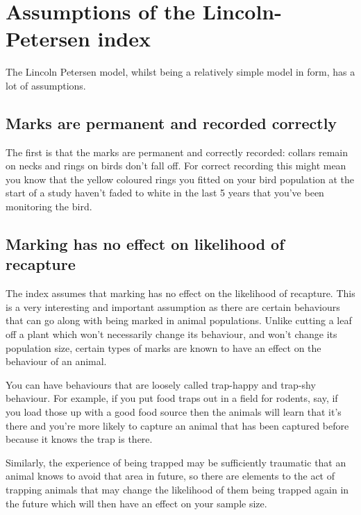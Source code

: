 \documentclass[
  letterpaper,
  DIV=11,
  numbers=noendperiod]{scrreprt}
\begin{document}
\section{Assumptions of the Lincoln-Petersen
index}\label{assumptions-of-the-lincoln-petersen-index}

The Lincoln Petersen model, whilst being a relatively simple model in
form, has a lot of assumptions.

\subsection{Marks are permanent and recorded
correctly}\label{marks-are-permanent-and-recorded-correctly}

The first is that the marks are permanent and correctly recorded:
collars remain on necks and rings on birds don't fall off. For correct
recording this might mean you know that the yellow coloured rings you
fitted on your bird population at the start of a study haven't faded to
white in the last 5 years that you've been monitoring the bird.

\subsection{Marking has no effect on likelihood of
recapture}\label{marking-has-no-effect-on-likelihood-of-recapture}

The index assumes that marking has no effect on the likelihood of
recapture. This is a very interesting and important assumption as there
are certain behaviours that can go along with being marked in animal
populations. Unlike cutting a leaf off a plant which won't necessarily
change its behaviour, and won't change its population size, certain
types of marks are known to have an effect on the behaviour of an
animal.

You can have behaviours that are loosely called trap-happy and trap-shy
behaviour. For example, if you put food traps out in a field for
rodents, say, if you load those up with a good food source then the
animals will learn that it's there and you're more likely to capture an
animal that has been captured before because it knows the trap is there.

Similarly, the experience of being trapped may be sufficiently traumatic
that an animal knows to avoid that area in future, so there are elements
to the act of trapping animals that may change the likelihood of them
being trapped again in the future which will then have an effect on your
sample size.
\end{document}
